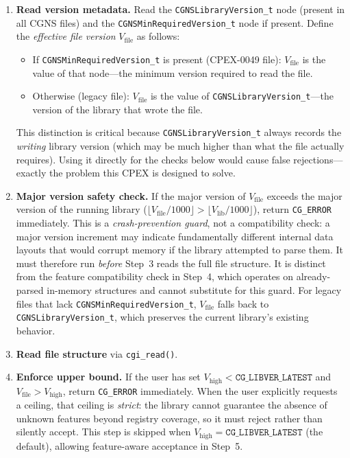 \documentclass[11pt,letterpaper]{article}
\begin{document}
\begin{enumerate}[leftmargin=2em]
\item \textbf{Read version metadata.}  Read the
  \texttt{CGNSLibraryVersion\_t} node (present in all CGNS files)
  and the \texttt{CGNSMinRequiredVersion\_t} node if present.
  Define the \emph{effective file version} $V_{\mathrm{file}}$ as
  follows:
  \begin{itemize}[leftmargin=1.5em]
  \item If \texttt{CGNSMinRequiredVersion\_t} is present
    (CPEX-0049 file): $V_{\mathrm{file}}$ is the value of that
    node---the minimum version required to read the file.
  \item Otherwise (legacy file): $V_{\mathrm{file}}$ is the value of
    \texttt{CGNSLibraryVersion\_t}---the version of the library that
    wrote the file.
  \end{itemize}
  This distinction is critical because
  \texttt{CGNSLibraryVersion\_t} always records the \emph{writing}
  library version (which may be much higher than what the file
  actually requires).  Using it directly for the checks below would
  cause false rejections---exactly the problem this CPEX is designed
  to solve.
\item \textbf{Major version safety check.}  If the major version of
  $V_{\mathrm{file}}$ exceeds the major version of the running library
  ($\lfloor V_{\mathrm{file}} / 1000 \rfloor >
   \lfloor V_{\mathrm{lib}} / 1000 \rfloor$),
  return \texttt{CG\_ERROR} immediately.  This is a
  \emph{crash-prevention guard}, not a compatibility check: a major
  version increment may indicate fundamentally different internal data
  layouts that would corrupt memory if the library attempted to parse
  them.  It must therefore run \emph{before} Step~3 reads the full
  file structure.  It is distinct from the feature compatibility check
  in Step~4, which operates on already-parsed in-memory structures and
  cannot substitute for this guard.
  For legacy files that lack \texttt{CGNSMinRequiredVersion\_t},
  $V_{\mathrm{file}}$ falls back to \texttt{CGNSLibraryVersion\_t},
  which preserves the current library's existing behavior.
\item \textbf{Read file structure} via \texttt{cgi\_read()}.
\item \textbf{Enforce upper bound.}  If the user has set
  $V_{\mathrm{high}} < \texttt{CG\_LIBVER\_LATEST}$ and
  $V_{\mathrm{file}} > V_{\mathrm{high}}$, return
  \texttt{CG\_ERROR} immediately.  When the user explicitly requests
  a ceiling, that ceiling is \emph{strict}: the library cannot
  guarantee the absence of unknown features beyond registry coverage,
  so it must reject rather than silently accept.  This step is
  skipped when $V_{\mathrm{high}} = \texttt{CG\_LIBVER\_LATEST}$
  (the default), allowing feature-aware acceptance in Step~5.


\end{enumerate}
\end{document}
